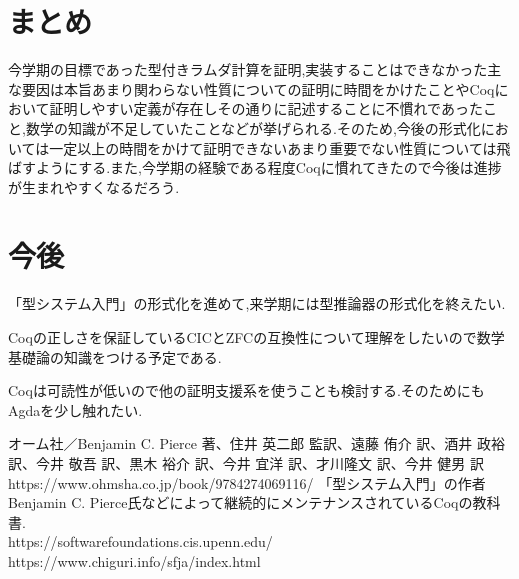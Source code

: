 \documentclass[fleqn,a4j,10pt]{jsarticle}
\begin{document}
\section{まとめ}
今学期の目標であった型付きラムダ計算を証明,実装することはできなかった主な要因は本旨あまり関わらない性質についての証明に時間をかけたことやCoqにおいて証明しやすい定義が存在しその通りに記述することに不慣れであったこと,数学の知識が不足していたことなどが挙げられる.そのため,今後の形式化においては一定以上の時間をかけて証明できないあまり重要でない性質については飛ばすようにする.また,今学期の経験である程度Coqに慣れてきたので今後は進捗が生まれやすくなるだろう.

\section{今後}
「型システム入門」の形式化を進めて,来学期には型推論器の形式化を終えたい.\par
Coqの正しさを保証しているCICとZFCの互換性について理解をしたいので数学基礎論の知識をつける予定である.\par
Coqは可読性が低いので他の証明支援系を使うことも検討する.そのためにもAgdaを少し触れたい.\par

\begin{thebibliography}{}
 オーム社／Benjamin C. Pierce 著、住井 英二郎 監訳、遠藤 侑介 訳、酒井 政裕 訳、今井 敬吾 訳、黒木 裕介 訳、今井 宜洋 訳、才川隆文 訳、今井 健男 訳 https://www.ohmsha.co.jp/book/9784274069116/
 「型システム入門」の作者Benjamin C. Pierce氏などによって継続的にメンテナンスされているCoqの教科書.\\
https://softwarefoundations.cis.upenn.edu/
 https://www.chiguri.info/sfja/index.html
\end{thebibliography}
\end{document}
